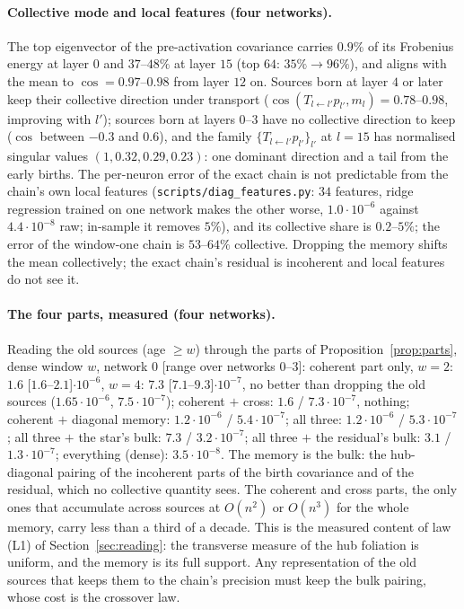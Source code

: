 \paragraph{Collective mode and local features (four networks).} The top eigenvector of the pre-activation covariance
carries $0.9\%$ of its Frobenius energy at layer $0$ and $37$--$48\%$ at layer $15$ (top $64$: $35\%\to96\%$), and
aligns with the mean to $\cos=0.97$--$0.98$ from layer $12$ on. Sources born at layer $4$ or later keep their collective
direction under transport ($\cos(T_{l\leftarrow l'}p_{l'},m_l)=0.78$--$0.98$, improving with $l'$); sources born at
layers $0$--$3$ have no collective direction to keep ($\cos$ between $-0.3$ and $0.6$), and the family
$\{T_{l\leftarrow l'}p_{l'}\}_{l'}$ at $l=15$ has normalised singular values $(1,0.32,0.29,0.23)$: one dominant
direction and a tail from the early births. The per-neuron error of the exact chain is not predictable from the
chain's own local features (\texttt{scripts/diag\_features.py}: $34$ features, ridge regression trained on one
network makes the other worse, $1.0\cdot10^{-6}$ against $4.4\cdot10^{-8}$ raw; in-sample it removes $5\%$), and its
collective share is $0.2$--$5\%$; the error of the window-one chain is $53$--$64\%$ collective. Dropping the memory
shifts the mean collectively; the exact chain's residual is incoherent and local features do not see it.

\paragraph{The four parts, measured (four networks).} Reading the old sources (age $\ge w$) through the parts of
Proposition~\ref{prop:parts}, dense window $w$, network $0$ [range over networks $0$--$3$]: coherent part only,
$w=2$: $1.6$ [$1.6$--$2.1$]$\cdot10^{-6}$, $w=4$: $7.3$ [$7.1$--$9.3$]$\cdot10^{-7}$, no better than dropping the old
sources ($1.65\cdot10^{-6}$, $7.5\cdot10^{-7}$); coherent $+$ cross: $1.6$ / $7.3\cdot10^{-7}$, nothing; coherent $+$ diagonal
memory: $1.2\cdot10^{-6}$ / $5.4\cdot10^{-7}$; all three: $1.2\cdot10^{-6}$ / $5.3\cdot10^{-7}$; all three $+$ the star's
bulk: $7.3$ / $3.2\cdot10^{-7}$; all three $+$ the residual's bulk: $3.1$ / $1.3\cdot10^{-7}$; everything (dense):
$3.5\cdot10^{-8}$. The memory is the bulk: the hub-diagonal pairing of the incoherent parts of the birth
covariance and of the residual, which no collective quantity sees. The coherent and cross parts, the only ones
that accumulate across sources at $O(n^2)$ or $O(n^3)$ for the whole memory, carry less than a third of a
decade. This is the measured content of law (L1) of Section~\ref{sec:reading}: the transverse measure of the
hub foliation is uniform, and the memory is its full support. Any representation of the old sources that keeps
them to the chain's precision must keep the bulk pairing, whose cost is the crossover law.

